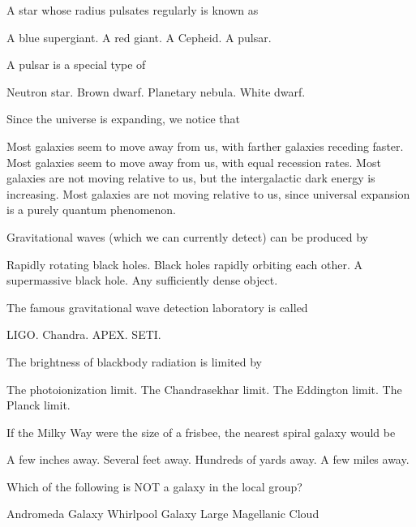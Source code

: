 \documentclass{exam}
\begin{document}
\begin{multicols*}{2}
\begin{questions}
	\question A star whose radius pulsates regularly is known as
	\begin{choices}
		\choice A blue supergiant.
		\choice A red giant.
		\CorrectChoice A Cepheid.
		\choice A pulsar.
	\end{choices}
	\question A pulsar is a special type of
	\begin{choices}
		\CorrectChoice Neutron star.
		\choice Brown dwarf.
		\choice Planetary nebula.
		\choice White dwarf.
	\end{choices}
	\question Since the universe is expanding, we notice that
	\begin{choices}
		\CorrectChoice Most galaxies seem to move away from us, with farther galaxies receding faster.
		\choice Most galaxies seem to move away from us, with equal recession rates.
		\choice Most galaxies are not moving relative to us, but the intergalactic dark energy is increasing.
		\choice Most galaxies are not moving relative to us, since universal expansion is a purely quantum phenomenon.
	\end{choices}
	\vfill\null\columnbreak
	\question Gravitational waves (which we can currently detect) can be produced by
	\begin{choices}
		\choice Rapidly rotating black holes.
		\CorrectChoice Black holes rapidly orbiting each other.
		\choice A supermassive black hole.
		\choice Any sufficiently dense object.
	\end{choices}
	\question The famous gravitational wave detection laboratory is called
	\begin{choices}
		\CorrectChoice LIGO.
		\choice Chandra.
		\choice APEX.
		\choice SETI.
	\end{choices}
	\question The brightness of blackbody radiation is limited by
	\begin{choices}
		\choice The photoionization limit.
		\choice The Chandrasekhar limit.
		\CorrectChoice The Eddington limit.
		\choice The Planck limit.
	\end{choices}
	\question If the Milky Way were the size of a frisbee, the nearest spiral galaxy would be
	\begin{choices}
		\choice A few inches away.
		\CorrectChoice Several feet away.
		\choice Hundreds of yards away.
		\choice A few miles away.
	\end{choices}
	\question Which of the following is NOT a galaxy in the local group?
	\begin{choices}
		\choice Andromeda Galaxy
		\CorrectChoice Whirlpool Galaxy
		\choice Large Magellanic Cloud

\end{choices}
\end{questions}
\end{multicols*}
\end{document}
